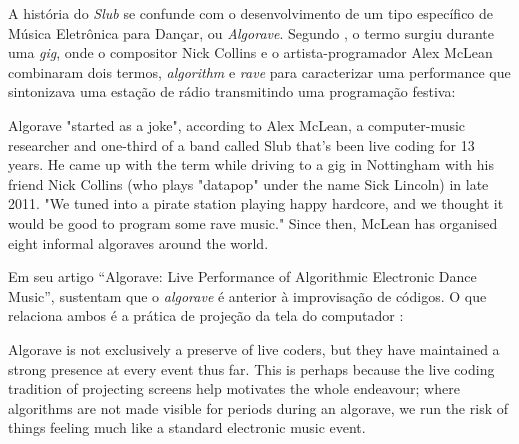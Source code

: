 A história do \emph{Slub} se confunde com o desenvolvimento de um tipo específico de Música Eletrônica para Dançar, ou \emph{Algorave}. Segundo , o termo surgiu durante uma \emph{gig}, onde o compositor Nick Collins e o artista-programador Alex McLean combinaram dois termos, \emph{algorithm} e \emph{rave} para caracterizar uma performance que sintonizava uma estação de rádio transmitindo uma programação festiva:

\begin{citacao}
{
Algorave "started as a joke", according to Alex McLean, a computer-music researcher and one-third of a band called Slub that's been live coding for 13 years. He came up with the term while driving to a gig in Nottingham with his friend Nick Collins (who plays "datapop" under the name Sick Lincoln) in late 2011. "We tuned into a pirate station playing happy hardcore, and we thought it would be good to program some rave music." Since then, McLean has organised eight informal algoraves around the world. 
}
\end{citacao}

Em seu artigo ``Algorave: Live Performance of Algorithmic Electronic Dance Music'',  sustentam que o \emph{algorave} é anterior à improvisação de códigos. O que relaciona ambos é a prática de projeção da tela do computador :

\begin{citacao}
{Algorave is not exclusively a preserve of live coders, but they have maintained a strong presence at every event thus far. This is perhaps because the live coding tradition of projecting screens help motivates the whole endeavour; where algorithms are not made visible for periods during an algorave, we run the risk of things feeling much like a standard electronic music event.}

\end{citacao}

